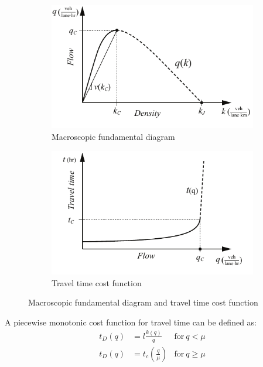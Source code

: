\documentclass{article}
\begin{document}
\begin{figure}[!ht]
     \centering
     \hfill
     \begin{subfigure}[b]{0.45\textwidth}
         \centering
         \includegraphics[width=\textwidth]{diagram_mfd}
         \caption{Macroscopic fundamental diagram}
         \label{fig:mfd}
     \end{subfigure}
     \hfill
     \begin{subfigure}[b]{0.45\textwidth}
         \centering
         \includegraphics[width=\textwidth]{diagram_traveltime}
        \caption{Travel time cost function}
         \label{fig:traveltime}
     \end{subfigure}
     \hfill
     \caption{Macroscopic fundamental diagram and travel time cost function}
\end{figure}

\noindent A piecewise monotonic cost function for travel time can be defined as:
\begin{subequations}
\begin{align}
    t_D(q) &= l \frac{k(q)}{q} & \text{for}~q < \mu \\
    t_D(q) &= t_c \left(\frac{q}{\mu}\right)  & \text{for}~q \geq \mu
\end{align}
\end{subequations}
\end{document}
